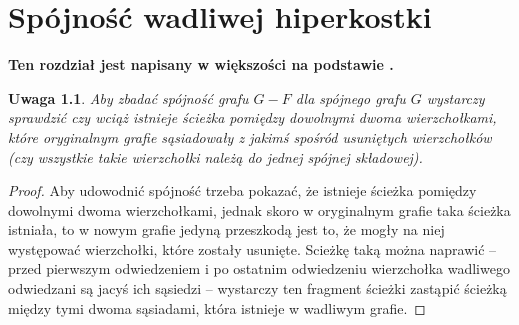 \documentclass{pracamgr}
\newtheorem{remark}[theorem]{Uwaga}
\begin{document}
 \chapter{Spójność wadliwej hiperkostki}
  \textbf{Ten rozdział jest napisany w większości na podstawie \cite{DFGKR}.}
  \begin{remark}\label{spojnosc przy usunietych}
   Aby zbadać spójność grafu $G-F$ dla spójnego grafu $G$ wystarczy sprawdzić czy wciąż istnieje ścieżka pomiędzy dowolnymi dwoma wierzchołkami,
   które oryginalnym grafie sąsiadowały z jakimś spośród usuniętych wierzchołków (czy wszystkie takie wierzchołki należą do jednej spójnej składowej).
  \end{remark}
  \begin{proof}
   Aby udowodnić spójność trzeba pokazać, że istnieje ścieżka pomiędzy dowolnymi dwoma wierzchołkami, jednak skoro w oryginalnym grafie taka ścieżka istniała,
   to w nowym grafie jedyną przeszkodą jest to, że mogły na niej występować wierzchołki, które zostały usunięte. 
   Scieżkę taką można naprawić -- przed pierwszym odwiedzeniem i po ostatnim odwiedzeniu wierzchołka wadliwego odwiedzani są jacyś ich sąsiedzi --
   wystarczy ten fragment ścieżki zastąpić ścieżką między tymi dwoma sąsiadami, która istnieje w wadliwym grafie.
  \end{proof}
\end{document}
